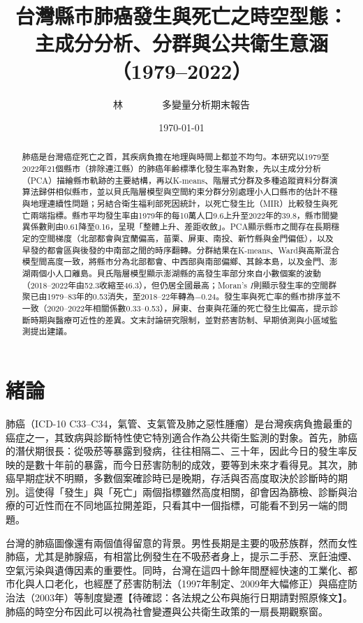 \documentclass[UTF8,a4paper,11pt]{ctexart}
\title{台灣縣市肺癌發生與死亡之時空型態：\\主成分分析、分群與公共衛生意涵（1979--2022）}
\author{林\ \ \ \ \ \ \ \ 多變量分析期末報告}
\date{\today}
\newcommand{\note}[1]{\textcolor{red!60!black}{【待確認：#1】}}
\begin{document}
\maketitle

\begin{abstract}
\noindent
肺癌是台灣癌症死亡之首，其疾病負擔在地理與時間上都並不均勻。本研究以1979至2022年21個縣市（排除連江縣）的肺癌年齡標準化發生率為對象，先以主成分分析（PCA）描繪縣市軌跡的主要結構，再以K-means、階層式分群及多種追蹤資料分群演算法歸併相似縣市，並以貝氏階層模型與空間約束分群分別處理小人口縣市的估計不穩與地理連續性問題；另結合衛生福利部死因統計，以死亡發生比（MIR）比較發生與死亡兩端指標。縣市平均發生率由1979年的每10萬人口9.6上升至2022年的39.8，縣市間變異係數則由0.61降至0.16，呈現「整體上升、差距收斂」。PCA顯示縣市之間存在長期穩定的空間梯度（北部都會與宜蘭偏高，苗栗、屏東、南投、新竹縣與金門偏低），以及早發的都會區與後發的中南部之間的時序翻轉。分群結果在K-means、Ward與高斯混合模型間高度一致，將縣市分為北部都會、中西部與南部偏鄉、其餘本島，以及金門、澎湖兩個小人口離島。貝氏階層模型顯示澎湖縣的高發生率部分來自小數個案的波動（2018--2022年由52.3收縮至46.3），但仍居全國最高；Moran's $I$則顯示發生率的空間群聚已由1979--83年的0.53消失，至2018--22年轉為$-0.24$。發生率與死亡率的縣市排序並不一致（2020--2022年相關係數0.33--0.53），屏東、台東與花蓮的死亡發生比偏高，提示診斷時期與醫療可近性的差異。文末討論研究限制，並對菸害防制、早期偵測與小區域監測提出建議。
\end{abstract}

\tableofcontents
\newpage

\section{緒論}
肺癌（ICD-10 C33--C34，氣管、支氣管及肺之惡性腫瘤）是台灣疾病負擔最重的癌症之一，其致病與診斷特性使它特別適合作為公共衛生監測的對象。首先，肺癌的潛伏期很長：從吸菸等暴露到發病，往往相隔二、三十年，因此今日的發生率反映的是數十年前的暴露，而今日菸害防制的成效，要等到未來才看得見。其次，肺癌早期症狀不明顯，多數個案確診時已是晚期，存活與否高度取決於診斷時的期別。這使得「發生」與「死亡」兩個指標雖然高度相關，卻會因為篩檢、診斷與治療的可近性而在不同地區拉開差距，只看其中一個指標，可能看不到另一端的問題。

台灣的肺癌圖像還有兩個值得留意的背景。男性長期是主要的吸菸族群，然而女性肺癌，尤其是肺腺癌，有相當比例發生在不吸菸者身上，提示二手菸、烹飪油煙、空氣污染與遺傳因素的重要性。同時，台灣在這四十餘年間歷經快速的工業化、都市化與人口老化，也經歷了菸害防制法（1997年制定、2009年大幅修正）與癌症防治法（2003年）等制度變遷\note{各法規之公布與施行日期請對照原條文}。肺癌的時空分布因此可以視為社會變遷與公共衛生政策的一扇長期觀察窗。
\end{document}
